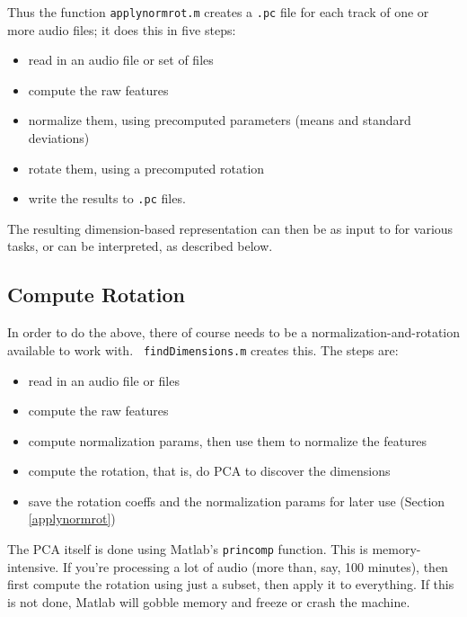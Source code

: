 \documentclass[11pt]{article}
\begin{document}
Thus the function {\tt applynormrot.m} creates a {\tt .pc} file for
each track of one or more audio files; it does this in five steps:
\begin{itemize}   \setlength{\itemsep}{0pt}\setlength{\parskip}{0pt}
\item read in an audio file or set of files
\item compute the raw  features
\item normalize them, using  precomputed parameters (means and
  standard deviations)
\item  rotate them, using a precomputed rotation
\item  write the results to {\tt .pc} files.
\end{itemize}

The resulting dimension-based representation can then be as input to
for various tasks, or can be interpreted, as described below.


\subsection{Compute Rotation} \label{computerotation}

In order to do the above, there of course needs to be a
normalization-and-rotation available to work with.  {\tt
  findDimensions.m} creates this.  The steps are:
\begin{itemize}   \setlength{\itemsep}{0pt}\setlength{\parskip}{0pt}
\item read in an audio file or files
\item compute the raw  features
\item compute normalization params, then use them to normalize the features
\item compute the rotation, that is, do PCA to discover the dimensions
\item save the rotation coeffs and the normalization params for later use (Section \ref{applynormrot})
\end{itemize}

The PCA itself is done using Matlab's {\tt princomp} function.  This
is memory-intensive.  If you're processing a lot of audio (more than,
say, 100 minutes), then first compute the rotation using just a
subset, then apply it to everything.  If this is not done, Matlab
will gobble memory and freeze or crash the machine.
\end{document}
